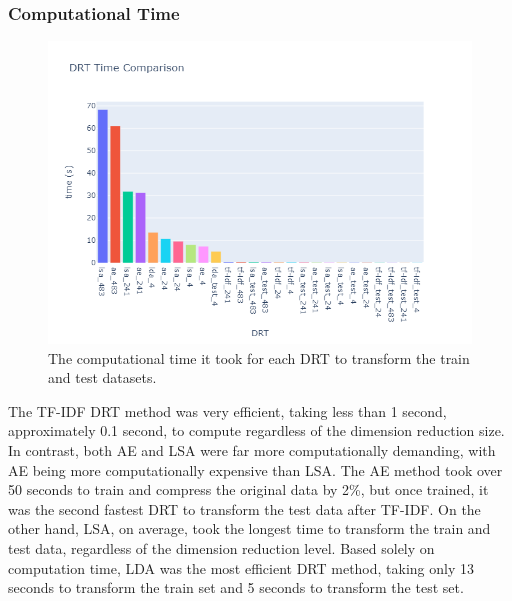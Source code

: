 \documentclass[12pt]{article}
\begin{document}
\subsubsection{Computational Time}
\begin{figure}[H]
  \centering
  \includegraphics[scale=0.60]{plots/time.png}
  \caption{The computational time it took for each DRT to transform the train and test datasets.}
\end{figure}

\hspace{\parindent} The TF-IDF DRT method was very efficient, taking less than 1 second, approximately 0.1 second, to compute regardless of the dimension reduction size. In contrast, both AE and LSA were far more computationally demanding, with AE being more computationally expensive than LSA. The AE method took over 50 seconds to train and compress the original data by 2\%, but once trained, it was the second fastest DRT to transform the test data after TF-IDF. On the other hand, LSA, on average, took the longest time to transform the train and test data, regardless of the dimension reduction level. Based solely on computation time, LDA was the most efficient DRT method, taking only 13 seconds to transform the train set and 5 seconds to transform the test set.
\end{document}
